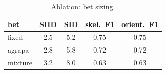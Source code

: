 \begin{table}[htbp]
\centering
\caption{Ablation: bet sizing.}
\label{tab:abl_bet}
\begin{tabular}{lcccc}
\hline
bet & SHD & SID & skel.\ F1 & orient.\ F1 \\
\hline
fixed & 2.5 & 5.2 & 0.75 & 0.75 \\
agrapa & 2.8 & 5.8 & 0.72 & 0.72 \\
mixture & 3.2 & 8.0 & 0.63 & 0.63 \\
\hline
\end{tabular}
\end{table}
